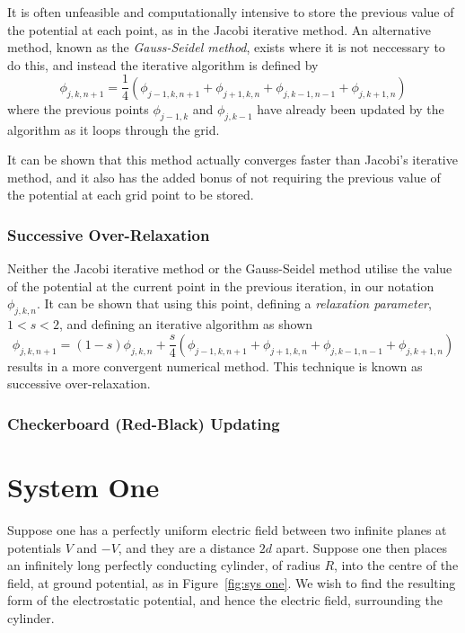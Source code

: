 \documentclass[12pt, a4paper]{article}
\newcommand{\be}{\begin{equation}}
\newcommand{\ee}{\end{equation}}
\begin{document}
It is often unfeasible and computationally intensive to store the previous value of the
potential at each point, as in the Jacobi iterative method. An alternative method, known
as the \emph{Gauss-Seidel method}, exists where it is not neccessary to do this, and
instead the iterative algorithm is defined by
%
\be
\phi_{j,k,n+1}= \frac{1}{4}(\phi_{j-1,k,n+1}+\phi_{j+1,k,n}+\phi_{j,k-1,n-1}+\phi_{j,k+1,n})
\ee
%
where the previous points $\phi_{j-1,k}$ and $\phi_{j,k-1}$ have already been updated
by the algorithm as it loops through the grid.

It can be shown that this method actually converges faster than Jacobi's iterative
method, and it also has the added bonus of not requiring the previous value of the 
potential at each grid point to be stored.

\subsubsection{Successive Over-Relaxation}

Neither the Jacobi iterative method or the Gauss-Seidel method utilise the value
of the potential at the current point in the previous iteration, in our notation
$\phi_{j,k,n}$. It can be shown that using this point, defining a
\emph{relaxation parameter}, $1<s<2$, and defining an iterative algorithm as shown
%
\be
\phi_{j,k,n+1}= (1-s)\phi_{j,k,n}+\frac{s}{4}(\phi_{j-1,k,n+1}+\phi_{j+1,k,n}+\phi_{j,k-1,n-1}+\phi_{j,k+1,n})
\ee
%
results in a more convergent numerical method. This technique is known as
successive over-relaxation.

\subsubsection{Checkerboard (Red-Black) Updating}

\section{System One}

Suppose one has a perfectly uniform electric field between two infinite planes
at potentials $V$ and $-V$, and they are a distance $2d$ apart. Suppose one then
places an infinitely long perfectly conducting cylinder, of radius $R$, into the centre
of the field, at ground potential, as in Figure~\ref{fig:sys one}. We wish to find the
resulting form of the electrostatic potential, and hence the electric field, surrounding
the cylinder.
\end{document}
